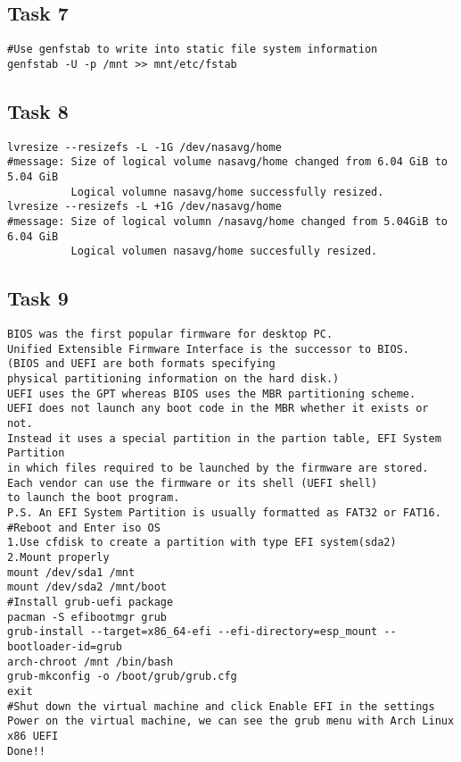 \documentclass{article}
\begin{document}
        \subsection{Task 7}

\begin{verbatim}
#Use genfstab to write into static file system information
genfstab -U -p /mnt >> mnt/etc/fstab
\end{verbatim}

        \subsection{Task 8}

\begin{verbatim}
lvresize --resizefs -L -1G /dev/nasavg/home
#message: Size of logical volume nasavg/home changed from 6.04 GiB to 5.04 GiB
          Logical volumne nasavg/home successfully resized.
lvresize --resizefs -L +1G /dev/nasavg/home
#message: Size of logical volumn /nasavg/home changed from 5.04GiB to 6.04 GiB
          Logical volumen nasavg/home succesfully resized.
\end{verbatim}

        \subsection{Task 9}
\begin{verbatim}
BIOS was the first popular firmware for desktop PC.
Unified Extensible Firmware Interface is the successor to BIOS.
(BIOS and UEFI are both formats specifying
physical partitioning information on the hard disk.)
UEFI uses the GPT whereas BIOS uses the MBR partitioning scheme.
UEFI does not launch any boot code in the MBR whether it exists or not.
Instead it uses a special partition in the partion table, EFI System Partition
in which files required to be launched by the firmware are stored.
Each vendor can use the firmware or its shell (UEFI shell)
to launch the boot program.
P.S. An EFI System Partition is usually formatted as FAT32 or FAT16.
#Reboot and Enter iso OS
1.Use cfdisk to create a partition with type EFI system(sda2)
2.Mount properly
mount /dev/sda1 /mnt
mount /dev/sda2 /mnt/boot
#Install grub-uefi package
pacman -S efibootmgr grub
grub-install --target=x86_64-efi --efi-directory=esp_mount --bootloader-id=grub
arch-chroot /mnt /bin/bash
grub-mkconfig -o /boot/grub/grub.cfg
exit
#Shut down the virtual machine and click Enable EFI in the settings
Power on the virtual machine, we can see the grub menu with Arch Linux x86 UEFI
Done!!
\end{verbatim}
\end{document}
